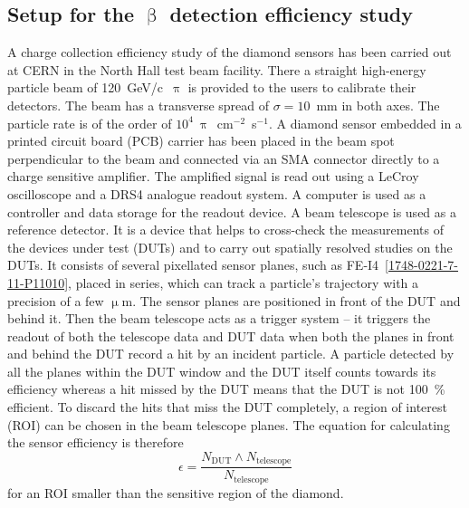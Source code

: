 \subsection{Setup for the $\upbeta$ detection efficiency study}
A charge collection efficiency study of the diamond sensors has been carried out at CERN in the North Hall test beam facility. There a straight high-energy particle beam of 120~GeV/c~$\uppi$ is provided to the users to calibrate their detectors. The beam has a transverse spread of $\sigma=10$~mm in both axes. The particle rate is of the order of $10^4~\uppi$~cm$^{-2}$~s$^{-1}$. A diamond sensor embedded in a printed circuit board (PCB) carrier has been placed in the beam spot perpendicular to the beam and connected via an SMA connector directly to a charge sensitive amplifier. The amplified signal is read out using a LeCroy oscilloscope and a DRS4 analogue readout system. A computer is used as a controller and data storage for the readout device. A beam telescope is used as a reference detector. It is a device that helps to cross-check the measurements of the devices under test (DUTs) and to carry out spatially resolved studies on the DUTs. It consists of several pixellated sensor planes, such as FE-I4~\ref{1748-0221-7-11-P11010}, placed in series, which can track a particle's trajectory with a precision of a few $\upmu$m. The sensor planes are positioned in front of the DUT and behind it. Then the beam telescope acts as a trigger system -- it triggers the readout of both the telescope data and DUT data when both the planes in front and behind the DUT record a hit by an incident particle. A particle detected by all the planes within the DUT window and the DUT itself counts towards its efficiency whereas a hit missed by the DUT means that the DUT is not 100~\% efficient. To discard the hits that miss the DUT completely, a region of interest (ROI) can be chosen in the beam telescope planes. The equation for calculating the sensor efficiency is therefore
\begin{equation}
\label{eq:sensoreff}
\epsilon = \frac{ N_\mathrm{DUT} \wedge N_\mathrm{telescope} }{ N_\mathrm{telescope} }
\end{equation}
for an ROI smaller than the sensitive region of the diamond.


